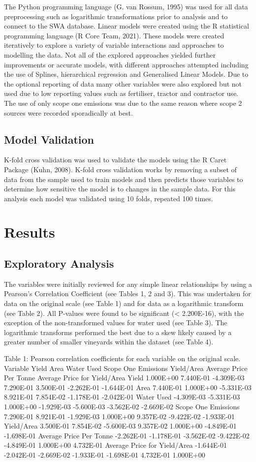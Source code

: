 \documentclass[
  journal=large,
  manuscript=article-type,
  year=2023,
  volume=?,
]{cup-journal}
\begin{document}
The Python programming language (G. van Rossum, 1995) was used for all data preprocessing such as logarithmic transformations prior to analysis and to connect to the SWA database. Linear models were created using the R statistical programming language (R Core Team, 2021). These models were created iteratively to explore a variety of variable interactions and approaches to modelling the data. Not all of the explored approaches yielded further improvements or accurate models, with different approaches attempted including the use of Splines, hierarchical regression and Generalised Linear Models. Due to the optional reporting of data many other variables were also explored but not used due to low reporting values such as fertiliser, tractor and contractor use. The use of only scope one emissions was due to the same reason where scope 2 sources were recorded sporadically at best.

\subsection{Model Validation}
K-fold cross validation was used to validate the models using the R Caret Package (Kuhn, 2008). K-fold cross validation works by removing a subset of data from the sample used to train models and then predicts those variables to determine how sensitive the model is to changes in the sample data. For this analysis each model was validated using 10 folds, repeated 100 times.


\section{Results}
\subsection{Exploratory Analysis}
The variables were initially reviewed for any simple linear relationships by using a Pearson’s Correlation Coefficient (see Tables 1, 2 and 3). This was undertaken for data on the original scale (see Table 1) and for data as a logarithmic transform (see Table 2). All P-values were found to be significant (< 2.200E-16), with the exception of the non-transformed values for water used (see Table 3). The logarithmic transforms performed the best due to a skew likely caused by a greater number of smaller vineyards within the dataset (see Table 4). 

Table 1: Pearson correlation coefficients for each variable on the original scale.
Variable
Yield
Area
Water Used
Scope One Emissions
Yield/Area
Average Price Per Tonne
Average Price for Yield/Area
Yield
1.000E+00
7.440E-01
-4.309E-03
7.290E-01
3.500E-01
-2.262E-01
-1.644E-01
Area
7.440E-01
1.000E+00
-5.331E-03
8.921E-01
7.854E-02
-1.178E-01
-2.042E-01
Water Used
-4.309E-03
-5.331E-03
1.000E+00
-1.929E-03
-5.600E-03
-3.562E-02
-2.669E-02
Scope One Emissions
7.290E-01
8.921E-01
-1.929E-03
1.000E+00
9.357E-02
-9.422E-02
-1.933E-01
Yield/Area
3.500E-01
7.854E-02
-5.600E-03
9.357E-02
1.000E+00
-4.849E-01
-1.698E-01
Average Price Per Tonne
-2.262E-01
-1.178E-01
-3.562E-02
-9.422E-02
-4.849E-01
1.000E+00
4.732E-01
Average Price for Yield/Area
-1.644E-01
-2.042E-01
-2.669E-02
-1.933E-01
-1.698E-01
4.732E-01
1.000E+00
\end{document}
